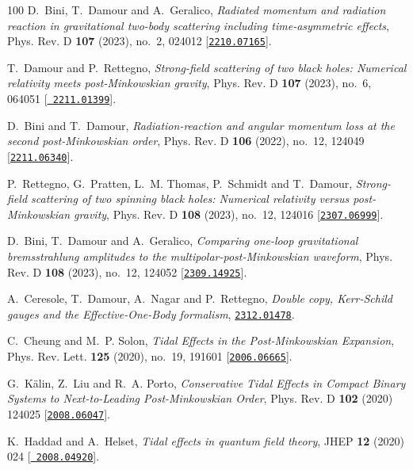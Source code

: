 \begin{thebibliography}{100}
D.~Bini, T.~Damour and A.~Geralico,  {\em {Radiated momentum and radiation
  reaction in gravitational two-body scattering including time-asymmetric
  effects}}, Phys. Rev. D {\bf 107} (2023), no.~2, 024012
  [\href{http://www.arXiv.org/abs/2210.07165}{{\tt 2210.07165}}].

T.~Damour and P.~Rettegno,  {\em {Strong-field scattering of two black holes:
  Numerical relativity meets post-Minkowskian gravity}}, Phys. Rev. D {\bf 107}
  (2023), no.~6, 064051 [\href{http://www.arXiv.org/abs/2211.01399}{{\tt
  2211.01399}}].

D.~Bini and T.~Damour,  {\em {Radiation-reaction and angular momentum loss at
  the second post-Minkowskian order}}, Phys. Rev. D {\bf 106} (2022), no.~12,
  124049 [\href{http://www.arXiv.org/abs/2211.06340}{{\tt 2211.06340}}].

P.~Rettegno, G.~Pratten, L.~M. Thomas, P.~Schmidt and T.~Damour,  {\em
  {Strong-field scattering of two spinning black holes: Numerical relativity
  versus post-Minkowskian gravity}}, Phys. Rev. D {\bf 108} (2023), no.~12,
  124016 [\href{http://www.arXiv.org/abs/2307.06999}{{\tt 2307.06999}}].

D.~Bini, T.~Damour and A.~Geralico,  {\em {Comparing one-loop gravitational
  bremsstrahlung amplitudes to the multipolar-post-Minkowskian waveform}},
  Phys. Rev. D {\bf 108} (2023), no.~12, 124052
  [\href{http://www.arXiv.org/abs/2309.14925}{{\tt 2309.14925}}].

A.~Ceresole, T.~Damour, A.~Nagar and P.~Rettegno,  {\em {Double copy,
  Kerr-Schild gauges and the Effective-One-Body formalism}},
  \href{http://www.arXiv.org/abs/2312.01478}{{\tt 2312.01478}}.

C.~Cheung and M.~P. Solon,  {\em {Tidal Effects in the Post-Minkowskian
  Expansion}}, Phys. Rev. Lett. {\bf 125} (2020), no.~19, 191601
  [\href{http://www.arXiv.org/abs/2006.06665}{{\tt 2006.06665}}].

G.~K\"alin, Z.~Liu and R.~A. Porto,  {\em {Conservative Tidal Effects in
  Compact Binary Systems to Next-to-Leading Post-Minkowskian Order}}, Phys.
  Rev. D {\bf 102} (2020) 124025
  [\href{http://www.arXiv.org/abs/2008.06047}{{\tt 2008.06047}}].

K.~Haddad and A.~Helset,  {\em {Tidal effects in quantum field theory}}, JHEP
  {\bf 12} (2020) 024 [\href{http://www.arXiv.org/abs/2008.04920}{{\tt
  2008.04920}}].


\end{thebibliography}
